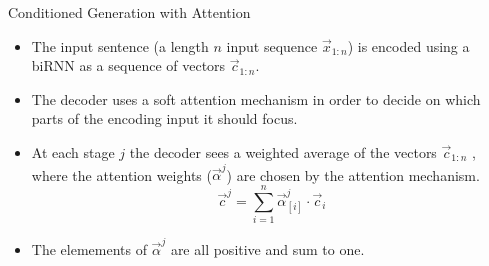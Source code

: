 \begin{frame}{Conditioned Generation with Attention}
\begin{scriptsize}
\begin{itemize}
\item The input sentence (a length $n$ input sequence $\vec{x}_{1:n}$) is encoded using a biRNN as a sequence of vectors $\vec{c}_{1:n}$.  
\item The decoder uses a soft attention mechanism in order to decide on which parts of the encoding input it should focus. 
\item At each stage $j$ the decoder sees a weighted average of the vectors $\vec{c}_{1:n}$ , where the attention weights ($\vec{\alpha}^j$) are chosen by the attention mechanism.
\begin{displaymath}
\vec{c}^j = \sum_{i=1}^{n} \vec{\alpha}_{[i]}^{j}\cdot \vec{c}_i 
\end{displaymath}
\item The elemements of $\vec{\alpha}^j$ are all positive and sum to one.



\end{itemize}
\end{scriptsize}
\end{frame}





